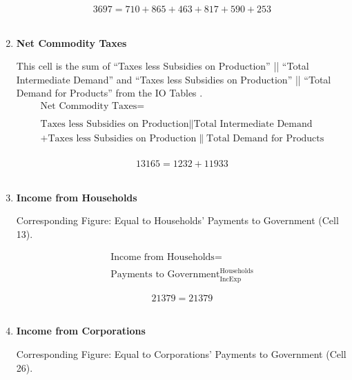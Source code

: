\begin{enumerate}
\begin{equation} \nonumber
3697 = 710+865+463+817+590+253
\end{equation}\\

\newpage

\item \textbf {Net Commodity Taxes}

This cell is the sum of ``Taxes less Subsidies on Production'' || ``Total Intermediate Demand'' and ``Taxes less Subsidies on Production'' || ``Total Demand for Products'' from the IO Tables \cite{ScotGov2013a}.\\

\begin{equation}
\begin{split}
\text{Net Commodity Taxes} =  \\ \\
\text{Taxes less Subsidies on Production}\|\text{Total Intermediate Demand}\\
+\text{Taxes less Subsidies on Production}\|\text{Total Demand for Products}\\
\end{split} \label{eq:2.5.36}
\end{equation}

\begin{equation} \nonumber
13165 = 1232+11933
\end{equation}\\


\item \textbf {Income from Households}

Corresponding Figure: Equal to Households' Payments to Government (Cell 13).

\begin{equation}
\begin{split}
\text{Income from Households} =  \\ \\
\text{Payments to Government}^\text{Households}_\text{IncExp}
\end{split} \label{eq:2.5.37}
\end{equation}

\begin{equation} \nonumber
21379 = 21379
\end{equation}\\


\item \textbf {Income from Corporations}

Corresponding Figure: Equal to Corporations' Payments to Government (Cell 26).


\end{enumerate}
